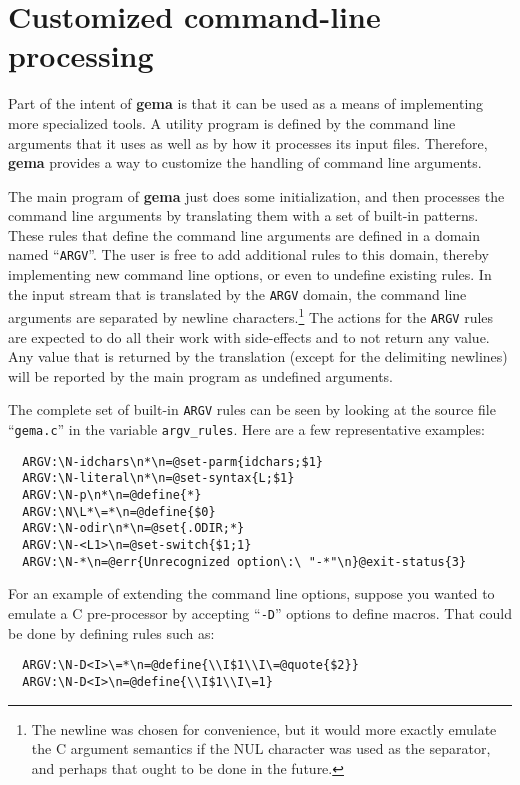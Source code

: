 
\section{Customized command-line processing}

Part of the intent of {\bf gema} is that it can be used as a means of
implementing more specialized tools.  A utility program is defined by
the command line arguments that it uses as well as by how it processes
its input files.  Therefore, {\bf gema} provides a way to customize the
handling of command line arguments.

The main program of {\bf gema} just does some initialization, and then
processes the command line arguments by translating them with a set of
built-in patterns.  These rules that define the command line arguments
are defined in a domain named ``{\tt ARGV}''.  The user is free to add
additional rules to this domain, thereby implementing new command line
options, or even to undefine existing rules.
In the input stream that is translated by the {\tt ARGV}
domain, the command line arguments are separated by newline
characters.\footnote{The newline was chosen for
convenience, but it would more exactly emulate the C argument
semantics if the NUL character was used as the separator, and perhaps
that ought to be done in the future.}
The actions for the {\tt ARGV} rules are expected to do all their work
with side-effects and to not return any value.  Any value that is
returned by the translation (except for the delimiting newlines) will be
reported by the main program as undefined arguments.

The complete set of built-in {\tt ARGV} rules can be seen by looking at
the source file ``{\tt gema.c}'' in the variable {\tt argv\_rules}.
Here are a few representative examples:
\begin{verbatim}
  ARGV:\N-idchars\n*\n=@set-parm{idchars;$1}
  ARGV:\N-literal\n*\n=@set-syntax{L;$1}
  ARGV:\N-p\n*\n=@define{*}
  ARGV:\N\L*\=*\n=@define{$0}
  ARGV:\N-odir\n*\n=@set{.ODIR;*}
  ARGV:\N-<L1>\n=@set-switch{$1;1}
  ARGV:\N-*\n=@err{Unrecognized option\:\ "-*"\n}@exit-status{3}
\end{verbatim}

For an example of extending the command line options, suppose you wanted
to emulate a C pre-processor by accepting ``\verb/-D/'' options to
define macros.  That could be done by defining rules such as:
\begin{verbatim}
  ARGV:\N-D<I>\=*\n=@define{\\I$1\\I\=@quote{$2}}
  ARGV:\N-D<I>\n=@define{\\I$1\\I\=1}
\end{verbatim}

